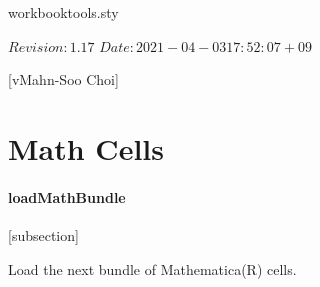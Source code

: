 \documentclass{article}
\begin{document}
\begin{package}{workbooktools.sty}

\begin{source}
\RequirePackage{kiwircs}
\end{source}

\begin{source}
\RCS $Revision: 1.17 $
\RCS $Date: 2021-04-03 17:52:07+09 $
\end{source}

\begin{source}
[\RCSTeXDate\space v\RCSRevision\space Mahn-Soo Choi]
\end{source}

\begin{source}
\RequirePackage{currfile}
\end{source}

\parindent=0pt

\section{Math Cells}

\paragraph{loadMathBundle}

\begin{source}[mathbundle]
[subsection]
\end{source}

\begin{source}[\bundle@file]
\newcommand\bundle@file{%
  \currfilebase.nbc/\the\c@section.\the\c@subsection-\themathbundle.tex}
\end{source}

\begin{source}
\newif\ifIgnoreBundleLoadError
\IgnoreBundleLoadErrorfalse
\end{source}

Load the next bundle of Mathematica(R) cells.

\begin{source}[\loadMathBundle]
\newcommand\loadMathBundle{%
  \stepcounter{mathbundle}
  \IfFileExists{\bundle@file}{%
    }{%
    \PackageWarning{workbooktools}{Bundle file \bundle@file\space not found}
    \ifIgnoreBundleLoadError\else{\textcolor{red}{\fbox{\bundle@file}}}\fi}}
\end{source}


\end{package}
\end{document}
